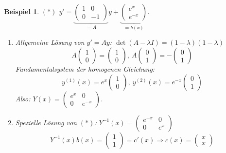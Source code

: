 \documentclass[12pt]{extreport} %
\theoremstyle{named}
\theoremstyle{nnamed}
\theoremstyle{itshape}
\theoremstyle{normal}
\newtheorem*{beispiel*}{Beispiel}
\begin{document}
\begin{beispiel*}
	$(*)$ $y' = \underbrace{\begin{pmatrix} 1 & 0 \\ 0 & -1 \end{pmatrix}}_{\eqqcolon A} y + \underbrace{\begin{pmatrix} e^{x} \\ e^{-x} \end{pmatrix}}_{\eqqcolon b(x)}$.
	
	\begin{enumerate}[label=\arabic*.]
		\item Allgemeine Lösung von $y' = A y$: $\det (A - \lambda I) = (1 - \lambda) (1 - \lambda)$
			$$ A \begin{pmatrix} 1 \\ 0 \end{pmatrix} = \begin{pmatrix} 1 \\ 0 \end{pmatrix}, ~ A \begin{pmatrix} 0 \\ 1 \end{pmatrix} = - \begin{pmatrix} 0 \\ 1 \end{pmatrix} $$
			Fundamentalsystem der homogenen Gleichung: 
			$$ y^{(1)}(x) = e^{x} \begin{pmatrix} 1 \\ 0 \end{pmatrix}, ~ y^{(2)}(x) = e^{-x} \begin{pmatrix} 0 \\ 1 \end{pmatrix} $$
			Also: $Y(x) = \begin{pmatrix} e^{x} & 0 \\ 0 & e^{-x} \end{pmatrix}$.
		\item Spezielle Lösung von $(*)$: $Y^{-1}(x) = \begin{pmatrix} e^{-x} & 0 \\ 0 & e^{x} \end{pmatrix}$
			$$ Y^{-1}(x) b(x) = \begin{pmatrix} 1 \\ 1 \end{pmatrix} = c'(x) \Longrightarrow c(x) = \begin{pmatrix} x \\ x \end{pmatrix}  $$

\end{enumerate}
\end{beispiel*}
\end{document}
